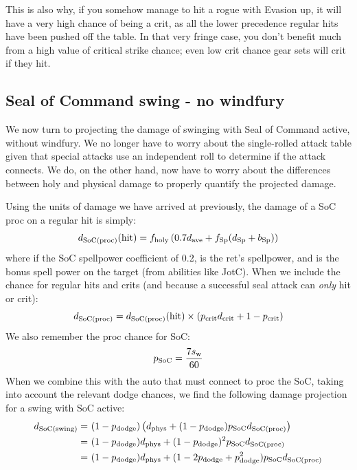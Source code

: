This is also why, if you somehow manage to hit a rogue with Evasion up, it will have a very high chance of being a crit, as all the lower precedence regular hits have been pushed off the table.
In that very fringe case, you don't benefit much from a high value of critical strike chance; even low crit chance gear sets will crit if they hit.

\subsection{Seal of Command swing - no windfury}
We now turn to projecting the damage of swinging with Seal of Command active, without windfury.
We no longer have to worry about the single-rolled attack table given that special attacks use an independent roll to determine if the attack connects.
We do, on the other hand, now have to worry about the differences between holy and physical damage to properly quantify the projected damage.

Using the units of damage we have arrived at previously, the damage of a SoC proc on a regular hit is simply:
\begin{equation}
	d_\mathrm{SoC(proc)} (\mathrm{hit}) = f_{\mathrm{holy}}  \left( 0.7  d_{\mathrm{ave}}  + f_{\mathrm{Sp}}  (d_\mathrm{Sp}  + b_\mathrm{Sp} ) \right)
\end{equation}
where \fspell if the SoC spellpower coefficient of 0.2, \dspell is the ret's spellpower, and \bspell is the bonus spell power on the target (from abilities like JotC).
When we include the chance for regular hits and crits (and because a successful seal attack can \emph{only} hit or crit):
\begin{equation}
	d_\mathrm{SoC(proc)}  = d_\mathrm{SoC(proc)} (\mathrm{hit}) \times ( p_{\mathrm{crit}}  d_{\mathrm{crit}}  + 1 - p_{\mathrm{crit}} )
\end{equation}
We also remember the proc chance for SoC:
\begin{equation}
	p_\mathrm{SoC}   = \frac{7 s_\mathrm{w} }{60}
\end{equation}
When we combine this with the auto that must connect to proc the SoC, taking into account the relevant dodge chances, we find the following damage projection for a swing with SoC active:
\begin{equation*}
	\begin{aligned}
		d_\mathrm{SoC(swing)}  =&~ (1-p_{\mathrm{dodge}} ) \left( d_{\mathrm{phys}}  + (1 - p_{\mathrm{dodge}} ) p_\mathrm{SoC}   d_\mathrm{SoC(proc)}  \right) \\
		=&~ (1 - p_{\mathrm{dodge}} ) d_{\mathrm{phys}}  + (1 - p_{\mathrm{dodge}} )^2 p_\mathrm{SoC}   d_\mathrm{SoC(proc)} \\
		=&~ (1 - p_{\mathrm{dodge}} ) d_{\mathrm{phys}}  + (1 - 2p_{\mathrm{dodge}}  + p_{\mathrm{dodge}} ^2 ) p_\mathrm{SoC}   d_\mathrm{SoC(proc)} \\
	\end{aligned}
\end{equation*}

